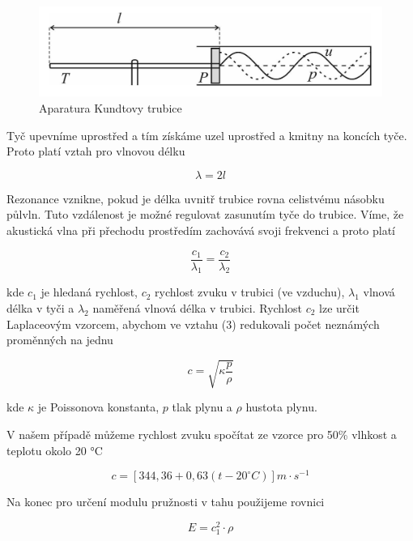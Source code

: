 \begin{figure}[h]
    \centering
    \includegraphics[width=0.6\linewidth]{10 - Rychlost šíření zvuku//Protokol//img/Aparatura Kundtovy trubice.png}
    \caption{Aparatura Kundtovy trubice}
    \label{fig:kundtova-trubice}
\end{figure}

Tyč upevníme uprostřed a tím získáme uzel uprostřed a kmitny na koncích tyče. Proto platí vztah pro vlnovou délku

\begin{equation}
    \lambda = 2l
\end{equation}

Rezonance vznikne, pokud je délka uvnitř trubice rovna celistvému násobku půlvln. Tuto vzdálenost je možné regulovat zasunutím tyče do trubice. Víme, že akustická vlna při přechodu prostředím zachovává svoji frekvenci a proto platí

\begin{equation}
    \frac{c_1}{\lambda_1}=\frac{c_2}{\lambda_2}
\end{equation}

kde \(c_1\) je hledaná rychlost, \(c_2\) rychlost zvuku v trubici (ve vzduchu), \(\lambda_1\) vlnová délka v tyči a \(\lambda_2\) naměřená vlnová délka v trubici. Rychlost \(c_2\) lze určit Laplaceovým vzorcem, abychom ve vztahu (3) redukovali počet neznámých proměnných na jednu

\begin{equation}
    c = \sqrt{\kappa \frac{p}{\rho}}
\end{equation}

kde \(\kappa\) je Poissonova konstanta, \(p\) tlak plynu a \(\rho\) hustota plynu.

V našem případě můžeme rychlost zvuku spočítat ze vzorce pro 50\% vlhkost a teplotu okolo 20 °C

\begin{equation}
    c = [344,36 + 0,63(t - 20 ^{\circ} C)] m \cdot s^{-1}
\end{equation}

Na konec pro určení modulu pružnosti v tahu použijeme rovnici

\begin{equation}
    E = c_1^2 \cdot \rho
\end{equation}

